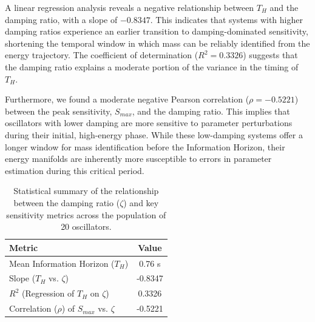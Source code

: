 \documentclass[]{article}
\begin{document}
A linear regression analysis reveals a negative relationship between $T_H$ and the damping ratio, with a slope of $-0.8347$. This indicates that systems with higher damping ratios experience an earlier transition to damping-dominated sensitivity, shortening the temporal window in which mass can be reliably identified from the energy trajectory. The coefficient of determination ($R^2 = 0.3326$) suggests that the damping ratio explains a moderate portion of the variance in the timing of $T_H$.

Furthermore, we found a moderate negative Pearson correlation ($\rho = -0.5221$) between the peak sensitivity, $S_{max}$, and the damping ratio. This implies that oscillators with lower damping are more sensitive to parameter perturbations during their initial, high-energy phase. While these low-damping systems offer a longer window for mass identification before the Information Horizon, their energy manifolds are inherently more susceptible to errors in parameter estimation during this critical period.

\begin{table}[h!]
\centering
\caption{Statistical summary of the relationship between the damping ratio ($\zeta$) and key sensitivity metrics across the population of 20 oscillators.}
\label{tab:stats_summary}
\begin{tabular}{lc}
\hline
\hline
Metric & Value \\
\hline
Mean Information Horizon ($T_H$) & 0.76 s \\
Slope ($T_H$ vs. $\zeta$) & -0.8347 \\
$R^2$ (Regression of $T_H$ on $\zeta$) & 0.3326 \\
Correlation ($\rho$) of $S_{max}$ vs. $\zeta$ & -0.5221 \\
\hline
\end{tabular}
\end{table}
\end{document}
